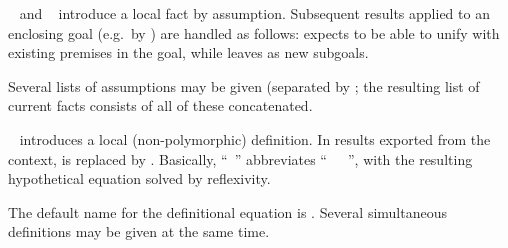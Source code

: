 \begin{isabellebody}
\begin{isamarkuptext}
\begin{description}
  \item \hyperlink{command.assume}{\mbox{}}~ and \hyperlink{command.presume}{\mbox{}}~ introduce a local fact \isa{{\isachardoublequote}{\isasymphi}\ {\isasymturnstile}\ {\isasymphi}{\isachardoublequote}} by
  assumption.  Subsequent results applied to an enclosing goal (e.g.\
  by \hyperlink{command.show}{\mbox{}}) are handled as follows: \hyperlink{command.assume}{\mbox{}} expects to be able to unify with existing premises in the
  goal, while \hyperlink{command.presume}{\mbox{\isa{\isacommand{presume}}}} leaves \isa{{\isasymphi}} as new subgoals.
  
  Several lists of assumptions may be given (separated by
  \hyperlink{keyword.and}{\mbox{}}; the resulting list of current facts consists
  of all of these concatenated.
  
  \item \hyperlink{command.def}{\mbox{}}~ introduces a local
  (non-polymorphic) definition.  In results exported from the context,
  \isa{x} is replaced by \isa{t}.  Basically, ``\hyperlink{command.def}{\mbox{}}~'' abbreviates ``\hyperlink{command.fix}{\mbox{}}~~\hyperlink{command.assume}{\mbox{}}~'', with the resulting
  hypothetical equation solved by reflexivity.
  
  The default name for the definitional equation is .
  Several simultaneous definitions may be given at the same time.

  \end{description}


\end{isamarkuptext}
\end{isabellebody}
